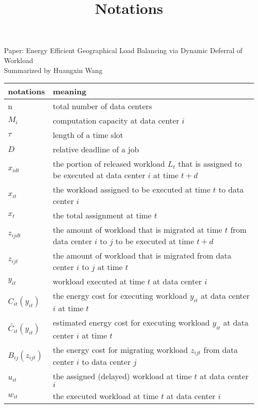 \documentclass[10 pt,final]{article}
\begin{document}
\title{Notations}


\date{}

\maketitle

Paper: Energy Efficient Geographical Load Balancing via Dynamic Deferral of Workload \\

Summarized by Huangxin Wang

\begin{table}[!ht]
\centering
\begin{tabular}{|l|l|}
\hline
notations & meaning \\  \hline \hline
n & total number of data centers \\ 
$M_i$ & computation capacity at data center $i$ \\ 
$\tau$ & length of a time slot \\ 
$D$ & relative deadline of a job \\ 
$x_{idt}$ & the portion of released workload $L_t$ that is assigned to be executed at data center $i$ at time $t+d$ \\
$x_{it}$ & the workload assigned to be executed at time $t$ to data center $i$ \\
$x_t$ & the total assignment at time $t$ \\
$z_{ijdt}$ & the amount of workload that is migrated at time $t$ from data center $i$ to $j$ to be executed at time $t+d$ \\
$z_{ijt}$ & the amount of workload that is migrated from data center $i$ to $j$ at time $t$ \\
$y_{it}$ & workload executed at time $t$ at data center $i$ \\ 
$C_{it}(y_{it})$ & the energy cost for executing workload $y_{it}$ at data center $i$ at time $t$ \\ 
$\tilde{C_{it}}(y_{it})$ & estimated energy cost for executing workload $y_{it}$ at data center $i$ at time $t$ \\ 
$B_{ij}(z_{ijt})$ & the energy cost for migrating workload $z_{ijt}$  from data center $i$ to data center $j$ \\
$u_{it}$ & the assigned (delayed) workload at time $t$ at data center $i$ \\
$w_{it}$ & the executed workload at time $t$ at data center $i$ \\ \hline

\end{tabular}
\end{table}
\end{document}
